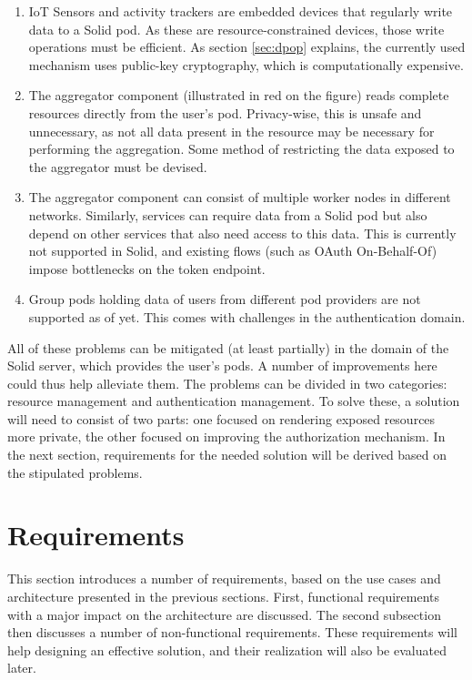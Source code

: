 \begin{enumerate}
    \item IoT Sensors and activity trackers are embedded devices that regularly write data to a Solid pod. As these are resource-constrained devices, those write operations must be efficient. As section \ref{sec:dpop} explains, the currently used mechanism uses public-key cryptography, which is computationally expensive.
    \item The aggregator component (illustrated in red on the figure) reads complete resources directly from the user's pod. Privacy-wise, this is unsafe and unnecessary, as not all data present in the resource may be necessary for performing the aggregation. Some method of restricting the data exposed to the aggregator must be devised.
    \item The aggregator component can consist of multiple worker nodes in different networks. Similarly, services can require data from a Solid pod but also depend on other services that also need access to this data. This is currently not supported in Solid, and existing flows (such as OAuth On-Behalf-Of) impose bottlenecks on the token endpoint. 
    \item Group pods holding data of users from different pod providers are not supported as of yet. This comes with challenges in the authentication domain.
\end{enumerate}

\noindent All of these problems can be mitigated (at least partially) in the domain of the Solid server, which provides the user's pods. A number of improvements here could thus help alleviate them. The problems can be divided in two categories: resource management and authentication management. To solve these, a solution will need to consist of two parts: one focused on rendering exposed resources more private, the other focused on improving the authorization mechanism. In the next section, requirements for the needed solution will be derived based on the stipulated problems.

\section{Requirements}
\label{sec:requirements}
This section introduces a number of requirements, based on the use cases and architecture presented in the previous sections. First, functional requirements with a major impact on the architecture are discussed. The second subsection then discusses a number of non-functional requirements. These requirements will help designing an effective solution, and their realization will also be evaluated later.

